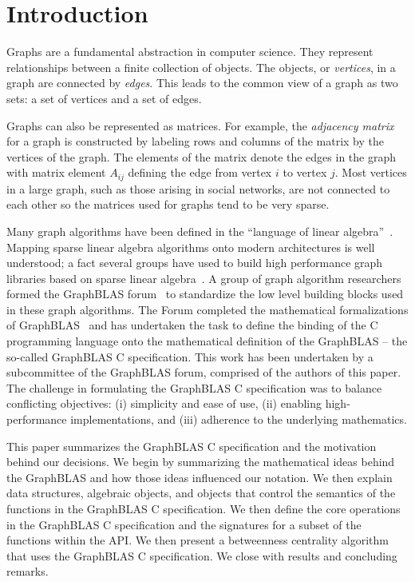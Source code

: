 \section{Introduction}
\label{sec:intro}

Graphs are a fundamental abstraction in computer science.  They represent
relationships between a finite collection of objects.   The objects, or
\emph{vertices}, in a graph are connected by \emph{edges}.  This leads
to the common view of a graph as two sets: a set of vertices and a set
of edges.

Graphs can also be represented as matrices.   For example, the
\emph{adjacency matrix} for a graph is constructed by labeling rows and
columns of the matrix by the vertices of the graph.  The elements of
the matrix denote the edges in the graph with matrix element $A_{ij}$
defining the edge from vertex $i$ to vertex $j$.  Most
vertices in a large graph, such as those arising in social networks,
are not connected to each other so the matrices used for graphs tend to
be very sparse.

Many graph algorithms have been defined in the ``language of linear
algebra''~\cite{kepner2011graph}.  Mapping sparse linear algebra algorithms 
onto modern architectures is well understood; a fact several 
groups have used to build high
performance graph libraries based on sparse linear algebra~\cite{combblas,
gadepally2015graphulo, gpi2016, sundaram2015graphmat,che2016programming}.  A group
of graph algorithm researchers formed the GraphBLAS
forum~\cite{graphblas_web} to standardize the low level building
blocks used in these graph algorithms.  The Forum completed the
mathematical formalizations of GraphBLAS~\cite{mathgraphblas16} and
has undertaken the task to define the
binding of the C programming language onto the mathematical definition of
the GraphBLAS -- the so-called GraphBLAS C specification.   This work
has been undertaken by a subcommittee of the GraphBLAS forum, comprised of
the authors of this paper.  The challenge in formulating
the GraphBLAS C specification was to balance conflicting 
objectives: (i) simplicity and ease of use,
(ii) enabling high-performance implementations, and (iii) adherence to
the underlying mathematics.

This paper summarizes the GraphBLAS C specification and the
motivation behind our  decisions.  We begin by summarizing the 
mathematical ideas behind the GraphBLAS and how those ideas
influenced our notation.  We then explain data structures,
algebraic objects, and objects that control the semantics of the functions
in the GraphBLAS C specification.  We then define the
core operations in the GraphBLAS C  specification and the signatures
for a subset of the functions  within the API.  We then present a betweenness centrality 
algorithm that uses the GraphBLAS C  specification. We close with results
and concluding remarks.
